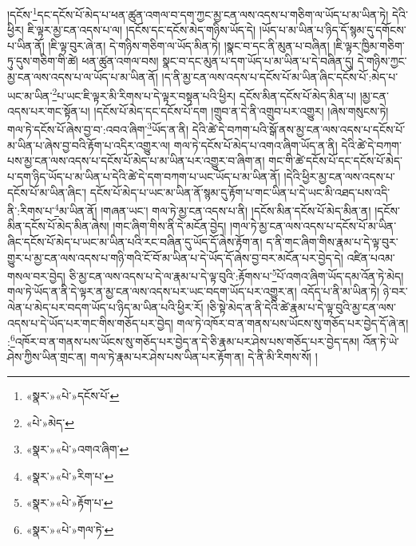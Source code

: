 །དངོས་\footnote{«སྣར་»«པེ་»དངོས་པོ་}དང་དངོས་པོ་མེད་པ་ཕན་ཚུན་འགལ་བ་དག་ཀྱང་མྱ་ངན་ལས་འདས་པ་གཅིག་ལ་ཡོད་པ་མ་ཡིན་ཏེ། དེའི་ཕྱིར། ཇི་ལྟར་མྱ་ངན་འདས་པ་ལ། །དངོས་དང་དངོས་མེད་གཉིས་ཡོད་དེ། །ཡོད་པ་མ་ཡིན་པ་ཉིད་དོ་སྙམ་དུ་དགོངས་པ་ཡིན་ནོ། །ཇི་ལྟ་བུར་ཞེ་ན། དེ་གཉིས་གཅིག་ལ་ཡོད་མིན་ཏེ། །སྣང་བ་དང་ནི་མུན་པ་བཞིན། །ཇི་ལྟར་ཁྱིམ་གཅིག་ཏུ་དུས་གཅིག་གི་ཚེ། ཕན་ཚུན་འགལ་བས། སྣང་བ་དང་མུན་པ་དག་ཡོད་པ་མ་ཡིན་པ་དེ་བཞིན་དུ། དེ་གཉིས་ཀྱང་མྱ་ངན་ལས་འདས་པ་ལ་ཡོད་པ་མ་ཡིན་ནོ། །ད་ནི་མྱ་ངན་ལས་འདས་པ་དངོས་པོ་མ་ཡིན་ཞིང་དངོས་པོ་:མེད་པ་ཡང་མ་ཡིན་\footnote{«པེ་»མེད་}པ་ཡང་ཇི་ལྟར་མི་རིགས་པ་དེ་ལྟར་བསྟན་པའི་ཕྱིར། དངོས་མིན་དངོས་པོ་མེད་མིན་པ། །མྱ་ངན་འདས་པར་གང་སྟོན་པ། །དངོས་པོ་མེད་དང་དངོས་པོ་དག །གྲུབ་ན་དེ་ནི་འགྲུབ་པར་འགྱུར། །ཞེས་གསུངས་ཏེ། གལ་ཏེ་དངོས་པོ་ཞེས་བྱ་བ་:འབའ་ཞིག་\footnote{«སྣར་»«པེ་»འགའ་ཞིག་}ཡོད་ན་ནི། དེའི་ཚེ་དེ་བཀག་པའི་སྒོ་ནས་མྱ་ངན་ལས་འདས་པ་དངོས་པོ་མ་ཡིན་པ་ཞེས་བྱ་བའི་རྟོག་པ་འདིར་འགྱུར་ལ། གལ་ཏེ་དངོས་པོ་མེད་པ་འགའ་ཞིག་ཡོད་ན་ནི། དེའི་ཚེ་དེ་བཀག་པས་མྱ་ངན་ལས་འདས་པ་དངོས་པོ་མེད་པ་མ་ཡིན་པར་འགྱུར་བ་ཞིག་ན། གང་གི་ཚེ་དངོས་པོ་དང་དངོས་པོ་མེད་པ་དག་ཉིད་ཡོད་པ་མ་ཡིན་པ་དེའི་ཚེ་དེ་དག་བཀག་པ་ཡང་ཡོད་པ་མ་ཡིན་ནོ། །དེའི་ཕྱིར་མྱ་ངན་ལས་འདས་པ་དངོས་པོ་མ་ཡིན་ཞིང་། དངོས་པོ་མེད་པ་ཡང་མ་ཡིན་ནོ་སྙམ་དུ་རྟོག་པ་གང་ཡིན་པ་དེ་ཡང་མི་འཐད་པས་འདི་ནི་:རིགས་པ་\footnote{«སྣར་»«པེ་»རིག་པ་}མ་ཡིན་ནོ། །གཞན་ཡང་། གལ་ཏེ་མྱ་ངན་འདས་པ་ནི། །དངོས་མིན་དངོས་པོ་མེད་མིན་ན། །དངོས་མིན་དངོས་པོ་མེད་མིན་ཞེས། །གང་ཞིག་གིས་ནི་དེ་མངོན་བྱེད། །གལ་ཏེ་མྱ་ངན་ལས་འདས་པ་དངོས་པོ་མ་ཡིན་ཞིང་དངོས་པོ་མེད་པ་ཡང་མ་ཡིན་པའི་རང་བཞིན་དུ་ཡོད་དོ་ཞེས་རྟོག་ན། ད་ནི་གང་ཞིག་གིས་རྣམ་པ་དེ་ལྟ་བུར་གྱུར་པ་མྱ་ངན་ལས་འདས་པ་གཉི་གའི་ངོ་བོ་མ་ཡིན་པ་དེ་ཡོད་དོ་ཞེས་བྱ་བར་མངོན་པར་བྱེད་དེ། འཛིན་པའམ་གསལ་བར་བྱེད། ཅི་མྱ་ངན་ལས་འདས་པ་དེ་ལ་རྣམ་པ་དེ་ལྟ་བུའི་:རྟོགས་པ་\footnote{«སྣར་»«པེ་»རྟོག་པ་}པོ་འགའ་ཞིག་ཡོད་དམ་འོན་ཏེ་མེད། གལ་ཏེ་ཡོད་ན་ནི་དེ་ལྟར་ན་མྱ་ངན་ལས་འདས་པར་ཡང་བདག་ཡོད་པར་འགྱུར་ན། འདོད་པ་ནི་མ་ཡིན་ཏེ། ཉེ་བར་ལེན་པ་མེད་པར་བདག་ཡོད་པ་ཉིད་མ་ཡིན་པའི་ཕྱིར་རོ། །ཅི་སྟེ་མེད་ན་ནི་དེའི་ཚེ་རྣམ་པ་དེ་ལྟ་བུའི་མྱ་ངན་ལས་འདས་པ་དེ་ཡོད་པར་གང་གིས་གཅོད་པར་བྱེད། གལ་ཏེ་འཁོར་བ་ན་གནས་པས་ཡོངས་སུ་གཅོད་པར་བྱེད་དོ་ཞེ་ན། :\footnote{«སྣར་»«པེ་»གལ་ཏེ་}འཁོར་བ་ན་གནས་པས་ཡོངས་སུ་གཅོད་པར་བྱེད་ན་དེ་ཅི་རྣམ་པར་ཤེས་པས་གཅོད་པར་བྱེད་དམ། འོན་ཏེ་ཡེ་ཤེས་ཀྱིས་ཡིན་གྲང་ན། གལ་ཏེ་རྣམ་པར་ཤེས་པས་ཡིན་པར་རྟོག་ན། དེ་ནི་མི་རིགས་སོ། །
